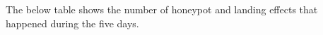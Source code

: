 The below table shows the number of honeypot and landing effects that happened during the five days.

\begin{table}[H]
\caption{Mobile Interactive Landing and honeypot effect}
\label{tab:landingandhonypot_mobile}
\centering
{}
\end{table}



